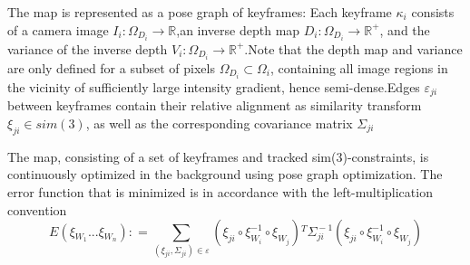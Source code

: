 The map is represented as a pose graph of keyframes: Each keyframe $\kappa_{i}$ consists of a camera image $I_{i}\!:\!\Omega_{D_{i}}\!\rightarrow \!{\mathbb{R}}$,an inverse depth map $D_{i}\!:\!\Omega_{D_{i}}\!\rightarrow \!{\mathbb{R}}^{+}$, and the variance of the inverse depth $ V_{i}\!:\!\Omega_{D_{i}}\!\rightarrow \!{\mathbb{R}}^{+}$.Note that the depth map and variance are only defined for a subset of pixels $ \Omega_{D_{i}}\!\subset\!\Omega_{i} $, containing all image regions in the vicinity of sufficiently large intensity gradient, hence semi-dense.Edges $ \varepsilon_{ji}$ between keyframes contain their relative alignment as similarity transform $ \xi_{ji}\in sim(3) $, as well as the corresponding covariance matrix $\Sigma_{ji} $

The map, consisting of a set of keyframes and tracked sim(3)-constraints, is continuously optimized in the background using pose graph optimization. The
error function that is minimized is in accordance with the left-multiplication convention
\begin{equation}
E(\xi\!_{W\!_{1}}\!...\!\xi\!_{W\!_{n}})\!:\!= \sum\limits_{(\!\xi\!_{ji},\Sigma\!_{ji}\!)\!\in\!\varepsilon}\!(\!\xi_{ji}\!\circ\!\xi_{\!W_{i}\!}^{-1}\! \!\circ\!\xi_{\!W\!_{j}}\!)\!^{T}\!\Sigma_{\!j\!i}^{\!-1\!}\!(\!\xi_{ji}\!\circ\!\xi_{\!W_{i}\!}^{-1}\! \!\circ\!\xi_{\!W\!_{j}}\!)
\end{equation}
\fi